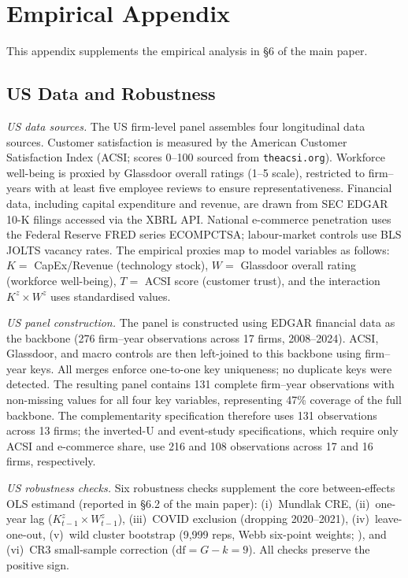 \documentclass[msom,dblanonrev]{informs4}
\begin{document}
\section{Empirical Appendix}\label{sec:ec:empirics}
{\small\setlength{\parskip}{2pt}
This appendix supplements the empirical analysis in \S6 of the main paper.

\subsection*{US Data and Robustness}

\textit{US data sources.}
The US firm-level panel assembles four longitudinal data sources. Customer satisfaction is measured by the American Customer Satisfaction Index (ACSI; scores 0--100 sourced from \texttt{theacsi.org}). Workforce well-being is proxied by Glassdoor overall ratings (1--5 scale), restricted to firm--years with at least five employee reviews to ensure representativeness. Financial data, including capital expenditure and revenue, are drawn from SEC EDGAR 10-K filings accessed via the XBRL API. National e-commerce penetration uses the Federal Reserve FRED series ECOMPCTSA; labour-market controls use BLS JOLTS vacancy rates. The empirical proxies map to model variables as follows: $K =$ CapEx/Revenue (technology stock), $W =$ Glassdoor overall rating (workforce well-being), $T =$ ACSI score (customer trust), and the interaction $K^z \times W^z$ uses standardised values.

\textit{US panel construction.}
The panel is constructed using EDGAR financial data as the backbone (276 firm--year observations across 17 firms, 2008--2024). ACSI, Glassdoor, and macro controls are then left-joined to this backbone using firm--year keys. All merges enforce one-to-one key uniqueness; no duplicate keys were detected. The resulting panel contains 131 complete firm--year observations with non-missing values for all four key variables, representing 47\% coverage of the full backbone. The complementarity specification therefore uses 131 observations across 13 firms; the inverted-U and event-study specifications, which require only ACSI and e-commerce share, use 216 and 108 observations across 17 and 16 firms, respectively.

\textit{US robustness checks.}
Six robustness checks supplement the core between-effects OLS estimand (reported in \S 6.2 of the main paper): (i)~Mundlak CRE, (ii)~one-year lag ($K_{t-1}^z \times W_{t-1}^z$), (iii)~COVID exclusion (dropping 2020--2021), (iv)~leave-one-out, (v)~wild cluster bootstrap (9{,}999 reps, Webb six-point weights; \citealp{webb2023reworking}), and (vi)~CR3 small-sample correction ($\mathrm{df} = G{-}k = 9$). All checks preserve the positive sign.

}
\end{document}
